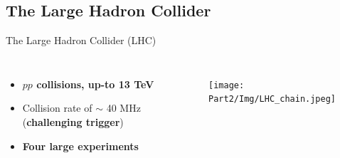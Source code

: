 \subsection{The Large Hadron Collider}
\begin{frame}{The Large Hadron Collider (LHC)}
\begin{columns}

\begin{itemize}
    \item \textbf{\textcolor{structurColor}{$pp$ collisions,} up-to 13 TeV}
    \item Collision rate of $\sim$ 40 MHz (\textbf{\textcolor{HHred}{challenging trigger}})
    \item\textbf{ Four large experiments} 
\end{itemize}
\begin{figure}
        \centering
        \texttt{[image: Part2/Img/LHC\_chain.jpeg]}
\end{figure}    
\end{columns}

\end{frame}

